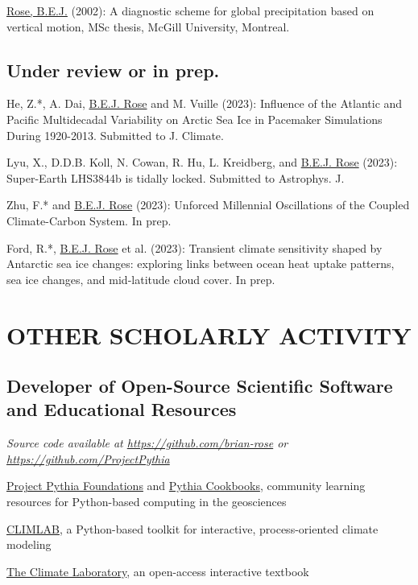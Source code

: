 \documentclass[11pt, letterpaper]{article} %
\newcommand{\years}[1]{\marginnote{\scriptsize #1}} %
\begin{document}
\years{2002}  
\underline{Rose, B.E.J.} (2002): A diagnostic scheme for global precipitation based on vertical motion, MSc thesis, McGill University, Montreal.


\subsection*{Under review or in prep.}\label{work-in-progress}

He, Z.*, A. Dai, \underline{B.E.J. Rose} and M. Vuille (2023): Influence of the Atlantic and Pacific Multidecadal Variability on Arctic Sea Ice in Pacemaker Simulations During 1920-2013. Submitted to J. Climate.

Lyu, X., D.D.B. Koll, N. Cowan, R. Hu, L. Kreidberg, and \underline{B.E.J. Rose} (2023): Super-Earth LHS3844b is tidally locked. Submitted to Astrophys. J.

Zhu, F.* and \underline{B.E.J. Rose} (2023): Unforced Millennial Oscillations of the Coupled Climate-Carbon System. In prep.

Ford, R.*, \underline{B.E.J. Rose} et al. (2023): Transient climate sensitivity shaped by Antarctic sea ice changes: exploring links between ocean heat uptake patterns, sea ice changes, and mid-latitude cloud cover. In prep.


\section*{OTHER SCHOLARLY ACTIVITY}\label{other-scholarly-activity}

\subsection*{Developer of Open-Source Scientific Software and Educational Resources}\label{computer-software}

\emph{Source code available at
\url{https://github.com/brian-rose} or \url{https://github.com/ProjectPythia}}
\vspace{0.2 cm}

\years{2021 -- } \href{https://foundations.projectpythia.org}{Project Pythia Foundations} and \href{https://cookbooks.projectpythia.org}{Pythia Cookbooks}, community learning resources for Python-based computing in the geosciences

\years{2014 -- } \href{https://github.com/brian-rose/climlab}{CLIMLAB}, a Python-based toolkit for interactive, process-oriented climate modeling

\years{2020 -- } \href{https://brian-rose.github.io/ClimateLaboratoryBook}{The Climate Laboratory}, an open-access interactive textbook
\end{document}
